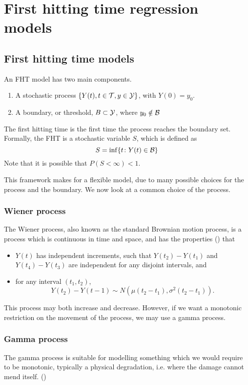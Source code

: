 \chapter{First hitting time regression models}
\label{sec:fht}

\section{First hitting time models}
An FHT model has two main components.
\begin{enumerate}
    \item A stochastic process $\{Y(t), t\in\mathcal{T},y\in\mathcal{Y}\}$, with $Y(0)=y_0$.
    \item A boundary, or threshold, $B\subset \mathcal{Y}$, where $y_0\notin\mathcal{B}$
\end{enumerate}
The first hitting time is the first time the process reaches the boundary set. Formally, the FHT is a stochastic variable $S$, which is defined as
\[
    S = \inf\{t\colon Y(t)\in\mathcal{B}\}
\]
Note that it is possible that $P(S<\infty)<1$.

This framework makes for a flexible model, due to many possible choices for the process and the boundary. We now look at a common choice of the process.

\subsection{Wiener process}
\label{wiener}
The Wiener process, also known as the standard Brownian motion process, is a process which is continuous in time and space, and has the properties (\cite[61]{caroni2017}) that
\begin{itemize}
    \item $Y(t)$ has independent increments, such that $Y(t_2)-Y(t_1)$ and $Y(t_4)-Y(t_3)$ are independent for any disjoint intervals, and
    \item for any interval $(t_1, t_2)$,
    \[
        Y(t_2)-Y(t-1)\sim N(\mu(t_2-t_1), \sigma^2(t_2-t_1)).
    \]
\end{itemize}
This process may both increase and decrease. However, if we want a monotonic restriction on the movement of the process, we may use a gamma process.

\subsection{Gamma process}
The gamma process is suitable for modelling something which we would require to be monotonic, typically a physical degradation, i.e. where the damage cannot mend itself. (\cite[59]{caroni2017})

